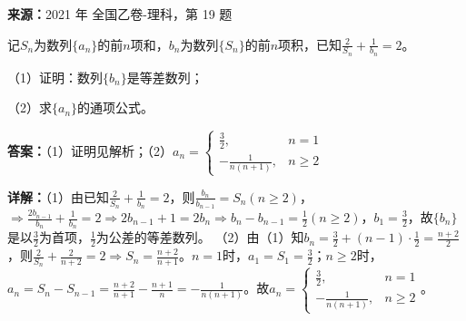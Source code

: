 \begin{question}[points=12]
\textbf{来源：}2021 年 全国乙卷-理科，第 19 题\par
记$S_n$为数列$\{a_n\}$的前$n$项和，$b_n$为数列$\{S_n\}$的前$n$项积，已知$\frac{2}{S_n}+\frac{1}{b_n}=2$。

（1）证明：数列$\{b_n\}$是等差数列；

（2）求$\{a_n\}$的通项公式。
\begin{solution}
\textbf{答案：}（1）证明见解析；（2）$a_n=\begin{cases}\frac32,&n=1\\ -\frac{1}{n(n+1)},&n\geq2\end{cases}$

\textbf{详解：}（1）由已知$\frac{2}{S_n}+\frac{1}{b_n}=2$，则$\frac{b_n}{b_{n-1}}=S_n(n\geq2)$，$\Rightarrow\frac{2b_{n-1}}{b_n}+\frac{1}{b_n}=2\Rightarrow 2b_{n-1}+1=2b_n\Rightarrow b_n-b_{n-1}=\frac12(n\geq2)$，$b_1=\frac32$，故$\{b_n\}$是以$\frac32$为首项，$\frac12$为公差的等差数列。
（2）由（1）知$b_n=\frac32+(n-1)\cdot\frac12=\frac{n+2}{2}$，则$\frac{2}{S_n}+\frac{2}{n+2}=2\Rightarrow S_n=\frac{n+2}{n+1}$。$n=1$时，$a_1=S_1=\frac32$；$n\geq2$时，$a_n=S_n-S_{n-1}=\frac{n+2}{n+1}-\frac{n+1}{n}=-\frac{1}{n(n+1)}$。故$a_n=\begin{cases}\frac32,&n=1\\ -\frac{1}{n(n+1)},&n\geq2\end{cases}$。
\end{solution}
\end{question}

